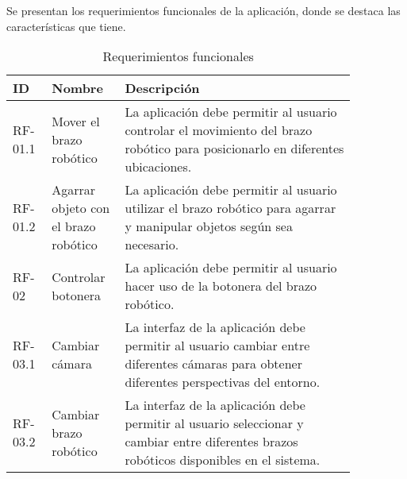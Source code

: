 Se presentan los requerimientos funcionales de la aplicación, donde se destaca las características que tiene.

\begin{table}[h!]
\centering
\begin{tabular}{ | m{0.09\linewidth} | m{0.17\linewidth} | m{0.6\linewidth} | }
\hline
ID & Nombre & Descripción \\
\hline
RF-01.1 & Mover el brazo robótico & La aplicación debe permitir al usuario controlar el movimiento del brazo robótico para posicionarlo en diferentes ubicaciones. \\
\hline
RF-01.2 & Agarrar objeto con el brazo robótico & La aplicación debe permitir al usuario utilizar el brazo robótico para agarrar y manipular objetos según sea necesario. \\
\hline
RF-02 & Controlar botonera & La aplicación debe permitir al usuario hacer uso de la botonera del brazo robótico. \\
\hline
RF-03.1 & Cambiar cámara & La interfaz de la aplicación debe permitir al usuario cambiar entre diferentes cámaras para obtener diferentes perspectivas del entorno. \\
\hline
RF-03.2 & Cambiar brazo robótico & La interfaz de la aplicación debe permitir al usuario seleccionar y cambiar entre diferentes brazos robóticos disponibles en el sistema. \\
\hline
\end{tabular}
\caption{Requerimientos funcionales}
\end{table}